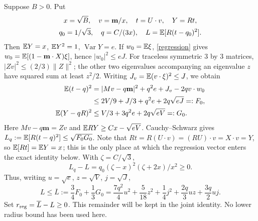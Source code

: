 Suppose $B>0$. Put
\[
 \begin{gathered}
 x=\sqrt B,\quad v=\mathbf m/x,\quad t=U\cdot v,\quad Y=Rt,\\
 q_0=1/\sqrt3,\quad q=C/(3x),\quad L=\mathbb E[R(t-q_0)^2].
 \end{gathered}
\]
Then $\mathbb E Y=x$, $\mathbb E Y^2=1$, $\operatorname{Var}Y=e$.
If $w_0=\mathbb E\xi$, \eqref{regression} gives
$w_0=\mathbb E[(1-\mathbf m\cdot X)\xi]$, hence $|w_0|^2\le eJ$.
For traceless symmetric $3$ by $3$ matrices,
$|Zv|^2\le(2/3)\|Z\|^2$; the other two eigenvalues accompanying an
eigenvalue $z$ have squared sum at least $z^2/2$.
Writing $J_v=\mathbb E(v\cdot\xi)^2\le J$, we obtain
\begin{align*}
 \mathbb E(t-q)^2
 &=|Mv-q\mathbf m|^2+q^2e+J_v-2qv\cdot w_0\\
 &\le 2V/9+J/3+q^2e+2q\sqrt{eJ}=:F_0,\\
 \mathbb E(Y-qR)^2&\le V/3+3q^2e+2q\sqrt{eV}=:G_0.
\end{align*}
Here $Mv-q\mathbf m=Zv$ and $\mathbb E RY\ge Cx-\sqrt{eV}$.
Cauchy--Schwarz gives $L_q:=\mathbb E[R(t-q)^2]\le\sqrt{F_0G_0}$.
Note that $Rt=R(U\cdot v)=(RU)\cdot v=X\cdot v=Y$, so $\mathbb E[Rt]=\mathbb E Y=x$;
this is the only place at which the regression vector enters the exact
identity below. With $\zeta=C/\sqrt3$,
\[
 L_q-L=q_0(\zeta-x)^2(\zeta+2x)/x^2\ge0.
\]
Thus, writing $u=\sqrt e$, $z=\sqrt V$, $j=\sqrt J$,
\begin{equation}\label{Lbar}
 L\le\overline L:=\frac34F_0+\frac13G_0
 =\frac{7q^2}{4}u^2+\frac5{18}z^2+\frac14j^2
                       +\frac{2q}{3}uz+\frac{3q}{2}uj.
\end{equation}
Set $r_{\rm reg}=\overline L-L\ge0$. This remainder will be kept
in the joint identity. No lower radius bound has been used here.
